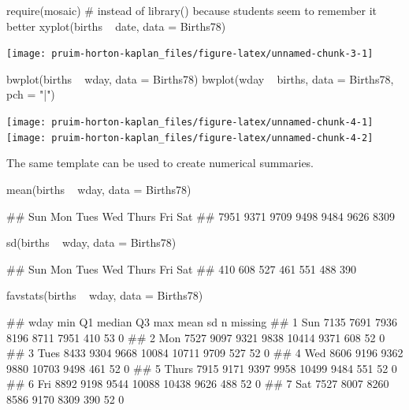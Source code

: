\begin{Schunk}
\begin{Sinput}
require(mosaic)     # instead of library() because students seem to remember it better
xyplot(births ~ date, data = Births78)
\end{Sinput}


\begin{center}\texttt{[image: pruim-horton-kaplan\_files/figure-latex/unnamed-chunk-3-1]} \end{center}

\end{Schunk}\begin{Schunk}
\begin{Sinput}
bwplot(births ~ wday, data = Births78) 
bwplot(wday ~ births, data = Births78, pch = "|")
\end{Sinput}


\begin{center}\texttt{[image: pruim-horton-kaplan\_files/figure-latex/unnamed-chunk-4-1]} \texttt{[image: pruim-horton-kaplan\_files/figure-latex/unnamed-chunk-4-2]} \end{center}

\end{Schunk}

\noindent
The same template can be used to create numerical summaries.

\begin{Schunk}
\begin{Sinput}
mean(births ~ wday, data = Births78)
\end{Sinput}
\begin{Soutput}
##   Sun   Mon  Tues   Wed Thurs   Fri   Sat 
##  7951  9371  9709  9498  9484  9626  8309
\end{Soutput}
\begin{Sinput}
sd(births ~ wday, data = Births78)
\end{Sinput}
\begin{Soutput}
##   Sun   Mon  Tues   Wed Thurs   Fri   Sat 
##   410   608   527   461   551   488   390
\end{Soutput}
\begin{Sinput}
favstats(births ~ wday, data = Births78)
\end{Sinput}
\begin{Soutput}
##    wday  min   Q1 median    Q3   max mean  sd  n missing
## 1   Sun 7135 7691   7936  8196  8711 7951 410 53       0
## 2   Mon 7527 9097   9321  9838 10414 9371 608 52       0
## 3  Tues 8433 9304   9668 10084 10711 9709 527 52       0
## 4   Wed 8606 9196   9362  9880 10703 9498 461 52       0
## 5 Thurs 7915 9171   9397  9958 10499 9484 551 52       0
## 6   Fri 8892 9198   9544 10088 10438 9626 488 52       0
## 7   Sat 7527 8007   8260  8586  9170 8309 390 52       0
\end{Soutput}
\end{Schunk}

